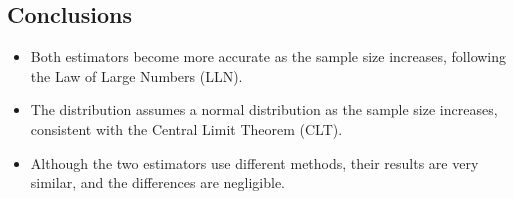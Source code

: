 \documentclass{report}
\begin{document}
\subsection{Conclusions}
\begin{itemize}
    \item Both estimators become more accurate as the sample size increases, following the Law of Large Numbers (LLN).
    \item The distribution assumes a normal distribution as the sample size increases, consistent with the Central Limit Theorem (CLT).
    \item Although the two estimators use different methods, their results are very similar, and the differences are negligible.
\end{itemize}
\end{document}
